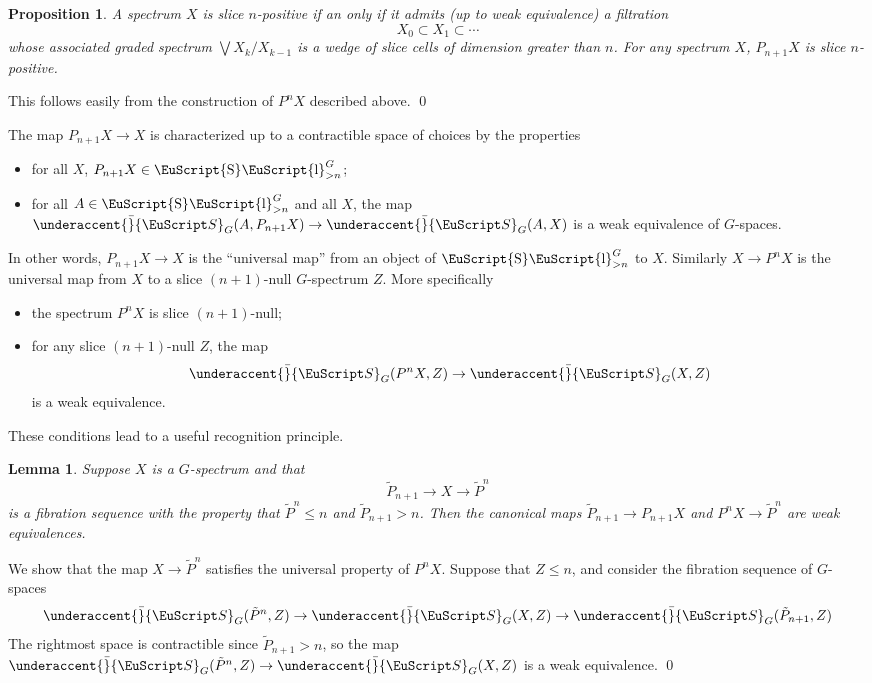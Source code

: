 \documentclass{amsart}
\newtheorem{lem}[equation]{Lemma}
\newtheorem{prop}[equation]{Proposition}
\theoremstyle{definition}
\theoremstyle{remark}
\newenvironment{pf}{\bigskip{\em Proof:\/}}{\qed\medskip}
\newcommand{\spectra}{\EuScript S}
\DeclareMathOperator{\slicesymbol}{\EuScript{S}\EuScript{l}}
\newcommand{\gslice}[1]{\slicesymbol^{G}_{>{#1}}}
\newcommand{\gspectra}[1]{\underaccent{\bar}{\spectra}_{#1}}
\begin{document}
\begin{prop}
\label{thm:35} A spectrum $X$ is slice $n$-positive if an only if it
admits (up to weak equivalence) a filtration
\[
X_{0} \subset X_{1}\subset \cdots
\]
whose associated graded spectrum $\bigvee X_{k}/X_{k-1}$ is a wedge of
slice cells of dimension greater than $n$.  For any spectrum $X$,
$P_{n+1}X$ is slice $n$-positive.
\end{prop}

\begin{pf}
This follows easily from the construction of $P^{n}X$ described above.
\end{pf}

The map $P_{n+1}X\to X$ is characterized up to a contractible space of
choices by the properties
\begin{itemize}
\item [i)] for all $X$, $P_{n+1}X\in\gslice{n}$;
\item [ii)] for all $A\in \gslice{n}$ and all $X$, the map
$\gspectra{G}(A,P_{n+1}X)\to \gspectra{G}(A,X)$ is a weak equivalence
of $G$-spaces.
\end{itemize}
In other words, $P_{n+1}X\to X$ is the ``universal map'' from an
object of $\gslice{n}$ to $X$.  Similarly $X\to P^{n}X$ is the
universal map from $X$ to a slice $(n+1)$-null $G$-spectrum
$Z$.  More specifically
\begin{itemize}
\item [iii)] the spectrum $P^{n}X$ is slice $(n+1)$-null;
\item [iv)] for any slice $(n+1)$-null $Z$, the map
\[
\gspectra{G}(P^{n}X,Z)\to
\gspectra{G}(X,Z)
\]
is a weak equivalence.
\end{itemize}
These conditions lead to a useful recognition principle.
\begin{lem}
\label{thm:7}
Suppose $X$ is a $G$-spectrum and that 
\[
\tilde{P}_{n+1}\to X\to \tilde P^{n}
\]
is a fibration sequence with the property that $\tilde P^{n}\le n$ and
$\tilde P_{n+1}>n$.  Then the canonical maps $\tilde{P}_{n+1}\to
P_{n+1}X$ and $P^{n}X\to \tilde P^{n}$ are weak equivalences.
\end{lem}

\begin{pf}
We show that the map $X\to\tilde P^{n}$ satisfies the universal
property of $P^{n}X$.  Suppose that $Z\le n$, and consider the
fibration sequence of $G$-spaces
\[
\gspectra{G}(\tilde P^{n},Z)\to\gspectra{G}(X,Z)\to\gspectra{G}(\tilde
P_{n+1},Z)
\]
The rightmost space is contractible since $\tilde P_{n+1}>n$, so the
map $\gspectra{G}(\tilde P^{n},Z)\to\gspectra{G}(X,Z)$ is a weak equivalence.
\end{pf}
\end{document}
